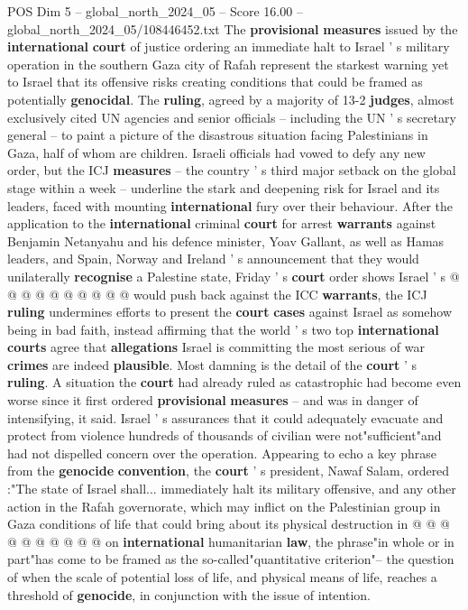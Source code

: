 \begin{textsample}{POS Dim 5 – global\_north\_2024\_05 – Score 16.00 – global\_north\_2024\_05/108446452.txt}  \label{ex:f5_pos_179}
The \textbf{provisional} \textbf{measures} issued by the \textbf{international} \textbf{court} of justice ordering an immediate halt to Israel ' s military operation in the southern Gaza city of Rafah represent the starkest warning yet to Israel that its offensive risks creating conditions that could be framed as potentially \textbf{genocidal}.
The \textbf{ruling}, agreed by a majority of 13-2 \textbf{judges}, almost exclusively cited UN agencies and senior officials -- including the UN ' s secretary general -- to paint a picture of the disastrous situation facing Palestinians in Gaza, half of whom are children.
Israeli officials had vowed to defy any new order, but the ICJ \textbf{measures} -- the country ' s third major setback on the global stage within a week -- underline the stark and deepening risk for Israel and its leaders, faced with mounting \textbf{international} fury over their behaviour.
After the application to the \textbf{international} criminal \textbf{court} for arrest \textbf{warrants} against Benjamin Netanyahu and his defence minister, Yoav Gallant, as well as Hamas leaders, and Spain, Norway and Ireland ' s announcement that they would unilaterally \textbf{recognise} a Palestine state, Friday ' s \textbf{court} order shows Israel ' s @ @ @ @ @ @ @ @ @ @ would push back against the ICC \textbf{warrants}, the ICJ \textbf{ruling} undermines efforts to present the \textbf{court} \textbf{cases} against Israel as somehow being in bad faith, instead affirming that the world ' s two top \textbf{international} \textbf{courts} agree that \textbf{allegations} Israel is committing the most serious of war \textbf{crimes} are indeed \textbf{plausible}.
Most damning is the detail of the \textbf{court} ' s \textbf{ruling}.
A situation the \textbf{court} had already ruled as catastrophic had become even worse since it first ordered \textbf{provisional} \textbf{measures} -- and was in danger of intensifying, it said.
Israel ' s assurances that it could adequately evacuate and protect from violence hundreds of thousands of civilian were not"sufficient"and had not dispelled concern over the operation.
Appearing to echo a key phrase from the \textbf{genocide} \textbf{convention}, the \textbf{court} ' s president, Nawaf Salam, ordered :"The state of Israel shall... immediately halt its military offensive, and any other action in the Rafah governorate, which may inflict on the Palestinian group in Gaza conditions of life that could bring about its physical destruction in @ @ @ @ @ @ @ @ @ @ on \textbf{international} humanitarian \textbf{law}, the phrase"in whole or in part"has come to be framed as the so-called"quantitative criterion"-- the question of when the scale of potential loss of life, and physical means of life, reaches a threshold of \textbf{genocide}, in conjunction with the issue of intention.

\end{textsample}
